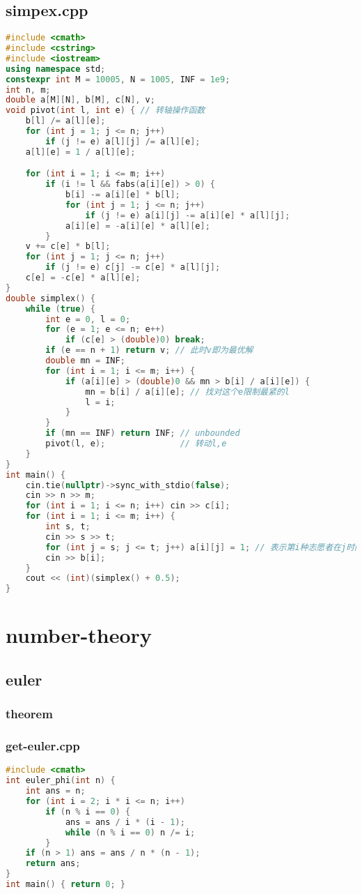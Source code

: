 \documentclass[9pt, a4paper, oneside]{book}
\begin{document}
\subsection{simpex.cpp}
\begin{lstlisting}[language={C++}]
#include <cmath>
#include <cstring>
#include <iostream>
using namespace std;
constexpr int M = 10005, N = 1005, INF = 1e9;
int n, m;
double a[M][N], b[M], c[N], v;
void pivot(int l, int e) { // 转轴操作函数
    b[l] /= a[l][e];
    for (int j = 1; j <= n; j++)
        if (j != e) a[l][j] /= a[l][e];
    a[l][e] = 1 / a[l][e];

    for (int i = 1; i <= m; i++)
        if (i != l && fabs(a[i][e]) > 0) {
            b[i] -= a[i][e] * b[l];
            for (int j = 1; j <= n; j++)
                if (j != e) a[i][j] -= a[i][e] * a[l][j];
            a[i][e] = -a[i][e] * a[l][e];
        }
    v += c[e] * b[l];
    for (int j = 1; j <= n; j++)
        if (j != e) c[j] -= c[e] * a[l][j];
    c[e] = -c[e] * a[l][e];
}
double simplex() {
    while (true) {
        int e = 0, l = 0;
        for (e = 1; e <= n; e++)
            if (c[e] > (double)0) break;
        if (e == n + 1) return v; // 此时v即为最优解
        double mn = INF;
        for (int i = 1; i <= m; i++) {
            if (a[i][e] > (double)0 && mn > b[i] / a[i][e]) {
                mn = b[i] / a[i][e]; // 找对这个e限制最紧的l
                l = i;
            }
        }
        if (mn == INF) return INF; // unbounded
        pivot(l, e);               // 转动l,e
    }
}
int main() {
    cin.tie(nullptr)->sync_with_stdio(false);
    cin >> n >> m;
    for (int i = 1; i <= n; i++) cin >> c[i];
    for (int i = 1; i <= m; i++) {
        int s, t;
        cin >> s >> t;
        for (int j = s; j <= t; j++) a[i][j] = 1; // 表示第i种志愿者在j时间可以服务
        cin >> b[i];
    }
    cout << (int)(simplex() + 0.5);
}\end{lstlisting}
\section{number-theory}
\subsection{euler}
\subsubsection{theorem}
\subsubsection{get-euler.cpp}
\begin{lstlisting}[language={C++}]
#include <cmath>
int euler_phi(int n) {
    int ans = n;
    for (int i = 2; i * i <= n; i++)
        if (n % i == 0) {
            ans = ans / i * (i - 1);
            while (n % i == 0) n /= i;
        }
    if (n > 1) ans = ans / n * (n - 1);
    return ans;
}
int main() { return 0; }\end{lstlisting}
\end{document}
